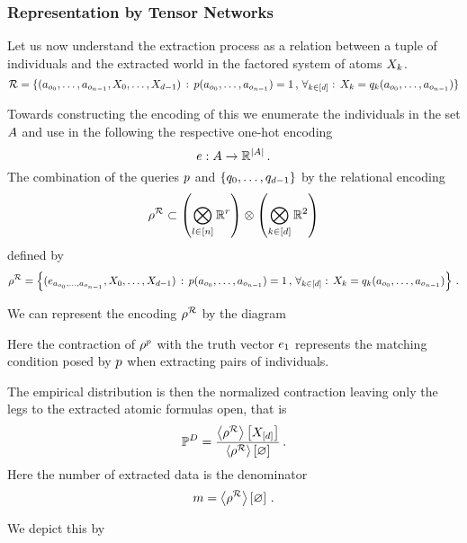 \subsubsection{Representation by Tensor Networks}

Let us now understand the extraction process as a relation between a tuple of individuals and the extracted world in the factored system of atoms $X_{k}$.
	\[ \mathcal{R}
	= \{ (a_{o_{0}},\ldots,a_{o_{n-1}}, X_{0},\ldots,X_{d-1}) 
	\, : \,  p(a_{o_{0}},\ldots,a_{o_{n-1}}) = 1 \, , \, \forall_{k\in[d]} : \,  X_{k} = q_{k}(a_{o_{0}},\ldots,a_{o_{n-1}}) \}\]
	
Towards constructing the encoding of this we enumerate the individuals in the set $A$ and use in the following the respective one-hot encoding 
	\[ e : A \rightarrow \mathbb{R}^{\left|A\right|} \, . \]
The combination of the queries $p$ and $\{q_{0},\ldots,q_{d-1}\}$ by the relational encoding
	\[\rho^{\mathcal{R}} \subset \left(\bigotimes_{l\in[n]}\mathbb{R}^{r}\right) \otimes \left(\bigotimes_{k\in[d]}\mathbb{R}^2\right) \]
defined by
	\[ \rho^{\mathcal{R}} 
	= \left\{ (e_{a_{o_{0}},\ldots,a_{o_{n-1}}}, X_{0},\ldots,X_{d-1}) 
	\, : \, p(a_{o_{0}},\ldots,a_{o_{n-1}}) = 1 \, , \, \forall_{k\in[d]} : \,  X_{k} = q_{k}(a_{o_{0}},\ldots,a_{o_{n-1}}) \right\} \, . \]

%
We can represent the encoding $\rho^{\mathcal{R}}$ by the diagram
\begin{center}
	
\end{center}
Here the contraction of $\rho^{p}$ with the truth vector $e_1$ represents the matching condition posed by $p$ when extracting pairs of individuals.

The empirical distribution is then the normalized contraction leaving only the legs to the extracted atomic formulas open, that is
\begin{align*}
 	\mathbb{P}^{D} 
	= \frac{
	\left\langle \rho^{\mathcal{R}}\right\rangle \left[ X_{[d]} \right]
	}{
	\left\langle \rho^{\mathcal{R}}\right\rangle \left[ \varnothing \right]
	}  \, . 
\end{align*}
Here the number of extracted data is the denominator
	\[ m = \left\langle \rho^{\mathcal{R}}\right\rangle \left[ \varnothing \right] \, .  \]
	
We depict this by
\begin{center}
	
\end{center}




